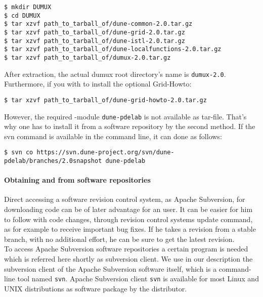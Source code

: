 \begin{lstlisting}[style=Bash]
$ mkdir DUMUX
$ cd DUMUX
$ tar xzvf path_to_tarball_of/dune-common-2.0.tar.gz 
$ tar xzvf path_to_tarball_of/dune-grid-2.0.tar.gz 
$ tar xzvf path_to_tarball_of/dune-istl-2.0.tar.gz 
$ tar xzvf path_to_tarball_of/dune-localfunctions-2.0.tar.gz 
$ tar xzvf path_to_tarball_of/dumux-2.0.tar.gz
\end{lstlisting}

After extraction, the actual dumux root directory's name is \texttt{dumux-2.0}.\\

Furthermore, if you with to install the optional \Dune Grid-Howto:

\begin{lstlisting}[style=Bash]
$ tar xzvf path_to_tarball_of/dune-grid-howto-2.0.tar.gz
\end{lstlisting}

However, the required \Dune-module \texttt{dune-pdelab} is not available as tar-file.
That's why one has to install it from a software repository by the second method.
If the svn command is available in the command line, it can done as follows: 

\begin{lstlisting}[style=Bash]
$ svn co https://svn.dune-project.org/svn/dune-pdelab/branches/2.0snapshot dune-pdelab
\end{lstlisting}

\paragraph{Obtaining \Dune and \Dumux from software repositories} 

Direct accessing a software revision control system, as Apache Subversion, for downloading code can be of later advantage for an user. 
It can be easier for him to follow with code changes, through revision control systems update command, as for example to receive important bug fixes. If he takes a revision from a stable branch, with no additional effort, he can be sure to get the latest revision. \\

To access Apache Subversion software repositories a certain program is needed which is referred here shortly as subversion client. We use in our description the subversion client of the Apache Subversion software itself, which is a command-line tool named \texttt{svn}. 
Apache Subversion client \texttt{svn} is available for most Linux and UNIX distributions as software package by the distributor.

